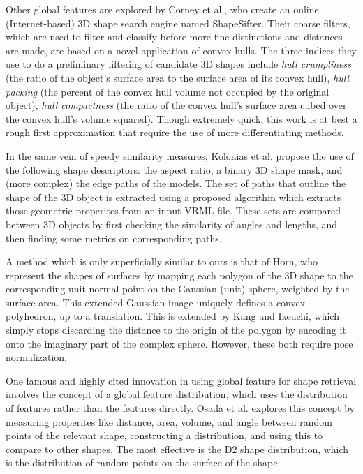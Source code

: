\documentclass[../tech_report_1.tex]{subfiles}
\begin{document}
Other global features are explored by Corney et al.\cite{corney2002coarse}, who create an online (Internet-based) 3D shape search engine named ShapeSifter. Their coarse filters, which are used to filter and classify before more fine distinctions and distances are made, are based on a novel application of convex hulls. The three indices they use to do a preliminary filtering of candidate 3D shapes include \textit{hull crumpliness} (the ratio of the object's surface area to the surface area of its convex hull), \textit{hull packing} (the percent of the convex hull volume not occupied by the original object), \textit{hull compactness} (the ratio of the convex hull's surface area cubed over the convex hull's volume squared). Though extremely quick, this work is at best a rough first approximation that require the use of more differentiating methods.

In the same vein of speedy similarity measures, Kolonias et al.\cite{kolonias2005fast} propose the use of the following shape descriptors: the aspect ratio, a binary 3D shape mask, and (more complex) the edge paths of the models. The set of paths that outline the shape of the 3D object is extracted using a proposed algorithm which extracts those geometric properites from an input VRML file. These sets are compared between 3D objects by first checking the similarity of angles and lengths, and then finding some metrics on corresponding paths.

A method which is only superficially similar to ours is that of Horn\cite{horn1984extended}, who represent the shapes of surfaces by mapping each polygon of the 3D shape to the corresponding unit normal point on the Gaussian (unit) sphere, weighted by the surface area. This extended Gaussian image uniquely defines a convex polyhedron, up to a translation. This is extended by Kang and Ikeuchi\cite{kang1991determining}, which simply stops discarding the distance to the origin of the polygon by encoding it onto the imaginary part of the complex sphere. However, these both require pose normalization.

One famous and highly cited innovation in using global feature for shape retrieval involves the concept of a global feature distribution, which uses the distribution of features rather than the features directly. Osada et al.\cite{osada2002shape} explores this concept by measuring properites like distance, area, volume, and angle between random points of the relevant shape, constructing a distribution, and using this to compare to other shapes. The most effective is the D2 shape distribution, which is the distribution of random points on the surface of the shape.
\end{document}
